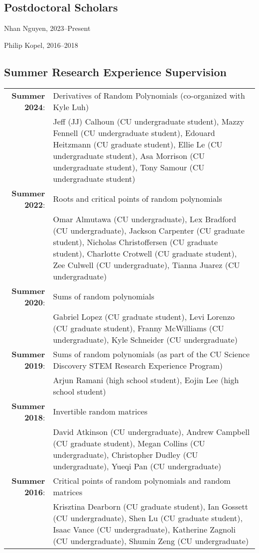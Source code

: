 \documentclass[letterpaper]{article}
\renewenvironment{itemize}{
  \begin{list}{}{
    \setlength{\leftmargin}{1em}
  }
}{
  \end{list}
}
\begin{document}

\subsection*{Postdoctoral Scholars}
\begin{itemize}
	\item Nhan Nguyen, 2023--Present
	\item Philip Kopel, 2016--2018
\end{itemize}

\subsection*{Summer Research Experience Supervision}
   \begin{tabular}{r p{4.65in}}
   {\bf Summer 2024}: & Derivatives of Random Polynomials (co-organized with Kyle Luh) \\
   & Jeff (JJ) Calhoun (CU undergraduate student), Mazzy Fennell (CU undergraduate student), Edouard Heitzmann (CU graduate student), Ellie Le (CU undergraduate student), Asa Morrison (CU undergraduate student), Tony Samour (CU undergraduate student) \\
   {\bf Summer 2022}: & Roots and critical points of random polynomials \\
   & Omar Almutawa (CU undergraduate), Lex Bradford (CU undergraduate), Jackson Carpenter (CU graduate student), Nicholas Christoffersen (CU graduate student), Charlotte Crotwell (CU graduate student),  Zee Culwell (CU undergraduate), Tianna Juarez (CU undergraduate) \\
   {\bf Summer 2020}: & Sums of random polynomials \\
   & Gabriel Lopez (CU graduate student), Levi Lorenzo (CU graduate student), Franny McWilliams (CU undergraduate), Kyle Schneider (CU undergraduate) \\
   {\bf Summer 2019}: & Sums of random polynomials (as part of the CU Science Discovery STEM Research Experience Program) \\
   & Arjun Ramani (high school student), Eojin Lee (high school student) \\
   {\bf Summer 2018}: & Invertible random matrices \\
   & David Atkinson (CU undergraduate), Andrew Campbell (CU graduate student), Megan Collins (CU undergraduate), Christopher Dudley (CU undergraduate), Yueqi Pan (CU undergraduate) \\
   {\bf Summer 2016}: & Critical points of random polynomials and random matrices \\
   & Krisztina Dearborn (CU graduate student), Ian Gossett (CU undergraduate), Shen Lu  (CU graduate student), Isaac Vance (CU undergraduate), Katherine Zagnoli (CU undergraduate), Shumin Zeng (CU undergraduate)
   \end{tabular}
   
\end{document}
